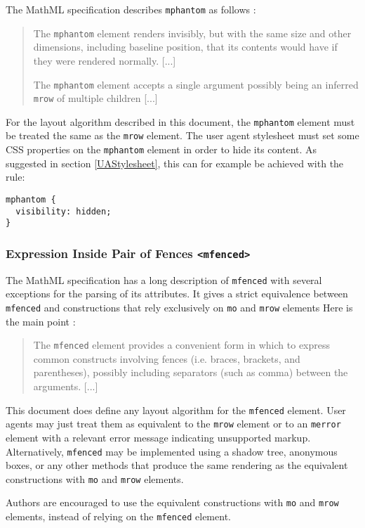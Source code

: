 The MathML specification describes {\tt mphantom} as follows \cite{MathML3}:
%
\begin{quote}
The {\tt mphantom} element renders invisibly, but with the same size and other
dimensions, including baseline position, that its contents would have if they
were rendered normally. [...]

The {\tt mphantom} element accepts a single argument possibly being an inferred
{\tt mrow} of multiple children [...]
\end{quote}

For the layout algorithm described in this document, the
{\tt mphantom} element must be treated the same as the {\tt mrow} element.
The user agent stylesheet must set some CSS properties on the {\tt mphantom}
element in order to hide its content.
As suggested in section \ref{UAStylesheet}, this can for example be achieved
with the rule:
%
\begin{lstlisting}
mphantom {
  visibility: hidden;
}
\end{lstlisting}

\subsubsection{Expression Inside Pair of Fences {\tt <mfenced>}}

The MathML specification has a long description of {\tt mfenced} with several
exceptions for the parsing of its attributes. It gives a strict equivalence
between {\tt mfenced} and constructions that rely exclusively on {\tt mo} and
{\tt mrow} elements Here is the main point \cite{MathML3}:
%
\begin{quote}
The {\tt mfenced} element provides a convenient form in which to express common
constructs involving fences (i.e. braces, brackets, and parentheses),
possibly including separators (such as comma) between the arguments.
[...]
\end{quote}

This document does define any layout algorithm for the {\tt mfenced}
element. User agents may just treat them as equivalent to the {\tt mrow} element
or to an {\tt merror} element with a relevant error message indicating
unsupported markup.
Alternatively, {\tt mfenced} may be implemented using a shadow tree, anonymous
boxes, or any other methods that produce the same rendering as the equivalent
constructions with {\tt mo} and {\tt mrow} elements.

Authors are encouraged to use the equivalent constructions with {\tt mo} and
{\tt mrow} elements, instead of relying on the {\tt mfenced} element.

